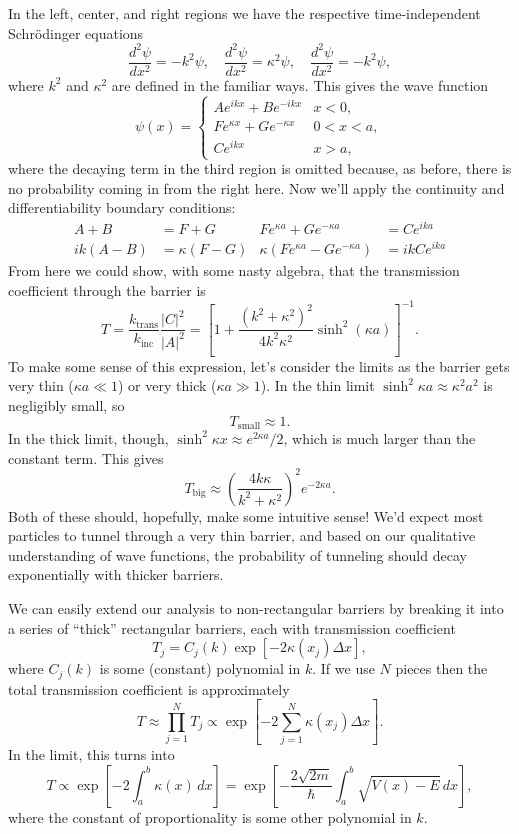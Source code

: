 \documentclass[../p052main.tex]{subfiles}
\begin{document}
In the left, center, and right regions we have the respective time-independent Schrödinger equations
\[ \frac{d^2 \psi}{d x^2} = -k^2 \psi, \quad \frac{d^2 \psi}{d x^2} = \kappa^2 \psi, \quad \frac{d^2 \psi}{d x^2} = -k^2 \psi, \]
where $k^2$ and $\kappa^2$ are defined in the familiar ways.
This gives the wave function
\[ \psi(x) = \begin{cases} Ae^{ikx} + Be^{-ikx} & x < 0, \\ Fe^{\kappa x} + Ge^{-\kappa x} & 0 < x < a, \\ Ce^{ikx} & x > a, \end{cases} \]
where the decaying term in the third region is omitted because, as before, there is no probability coming in from the right here.
Now we'll apply the continuity and differentiability boundary conditions:
\begin{align*}
    A + B &= F + G & Fe^{\kappa a} + Ge^{-\kappa a} &= Ce^{ika} \\
    ik (A - B) &= \kappa (F - G) & \kappa (Fe^{\kappa a} - Ge^{-\kappa a}) &= ik C e^{ika}
\end{align*}
From here we could show, with some nasty algebra, that the transmission coefficient through the barrier is
\[ T = \frac{k_\textrm{trans}}{k_\textrm{inc}} \frac{|C|^2}{|A|^2} = \left[ 1 + \frac{(k^2 + \kappa^2)^2}{4k^2\kappa^2} \sinh^2 (\kappa a) \right]^{-1}. \]
To make some sense of this expression, let's consider the limits as the barrier gets very thin ($\kappa a \ll 1$) or very thick ($\kappa a \gg 1$).
In the thin limit $\sinh^2 \kappa a \approx \kappa^2 a^2$ is negligibly small, so
\[ T_\textrm{small} \approx 1. \]
In the thick limit, though, $\sinh^2 \kappa x \approx e^{2\kappa a} / 2$, which is much larger than the constant term.
This gives
\[ T_\textrm{big} \approx \left( \frac{4k \kappa}{k^2 + \kappa^2} \right)^2 e^{-2\kappa a}. \]
Both of these should, hopefully, make some intuitive sense!
We'd expect most particles to tunnel through a very thin barrier, and based on our qualitative understanding of wave functions, the probability of tunneling should decay exponentially with thicker barriers.

We can easily extend our analysis to non-rectangular barriers by breaking it into a series of ``thick'' rectangular barriers, each with transmission coefficient
\[ T_j = C_j(k) \exp [-2 \kappa (x_j) \Delta x], \]
where $C_j(k)$ is some (constant) polynomial in $k$.
If we use $N$ pieces then the total transmission coefficient is approximately
\[ T \approx \prod_{j=1}^{N} T_j \propto \exp \left[ -2 \sum_{j=1}^{N} \kappa (x_j) \Delta x \right]. \]
In the limit, this turns into
\[ T \propto \exp \left[ -2 \int_{a}^{b} \kappa (x) \,dx \right] = \exp \left[ -\frac{2\sqrt{2m}}{\hbar} \int_{a}^{b} \sqrt{V(x) - E} \,dx \right], \]
where the constant of proportionality is some other polynomial in $k$.

\end{document}
